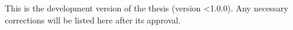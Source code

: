 

\clearpage


\imprimircapa



\imprimirfolhaderosto*


\begin{fichacatalografica}
 
\end{fichacatalografica}


\begin{errata}
  \noindent
  This is the development version of the thesis (version <1.0.0). Any necessary corrections will be listed here after its approval.
\end{errata}


